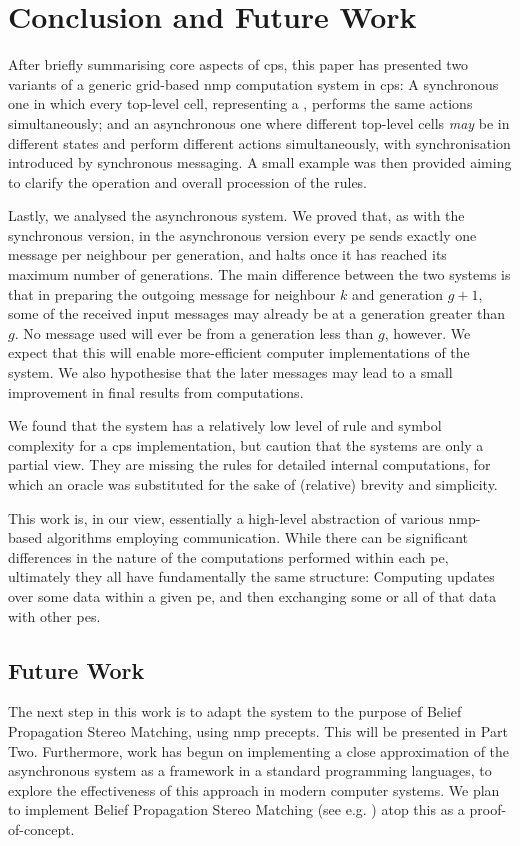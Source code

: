 \section{Conclusion and Future Work}
After briefly summarising core aspects of \gls{cps}, this paper has presented two variants of a generic grid-based \gls{nmp} computation system in \gls{cps}:  A synchronous one in which every top-level cell, representing a , performs the same actions simultaneously;  and an asynchronous one where different top-level cells \emph{may} be in different states and perform different actions simultaneously, with synchronisation introduced by synchronous messaging.  A small example was then provided aiming to clarify the operation and overall procession of the rules.

Lastly, we analysed the asynchronous system.  We proved that, as with the synchronous version, in the asynchronous version every \gls{pe} sends exactly one message per neighbour per generation, and halts once it has reached its maximum number of generations.  The main difference between the two systems is that in preparing the outgoing message for neighbour \(k\) and generation \(g + 1\), some of the received input messages may already be at a generation greater than \(g\).  No message used will ever be from a generation less than \(g\), however.  We expect that this will enable more-efficient computer implementations of the system.  We also hypothesise that the later messages may lead to a small improvement in final results from computations.

We found that the system has a relatively low level of rule and symbol complexity for a \gls{cps} implementation, but caution that the systems are only a partial view.  They are missing the rules for detailed internal computations, for which an oracle was substituted for the sake of (relative) brevity and simplicity.

This work is, in our view, essentially a high-level abstraction of various \gls{nmp}-based algorithms employing communication.  While there can be significant differences in the nature of the computations performed within each \gls{pe}, ultimately they all have fundamentally the same structure:  Computing updates over some data within a given \gls{pe}, and then exchanging some or all of that data with other \glspl{pe}.

\subsection{Future Work}
The next step in this work is to adapt the system to the purpose of Belief Propagation Stereo Matching, using \gls{nmp} precepts.  This will be presented in Part Two.  Furthermore, work has begun on implementing a close approximation of the asynchronous system as a framework in a standard programming languages, to explore the effectiveness of this approach in modern computer systems.  We plan to implement Belief Propagation Stereo Matching (see e.g. \cite{Blake2011,Felzenszwalb2011,JianSun2003}) atop this as a proof-of-concept.

